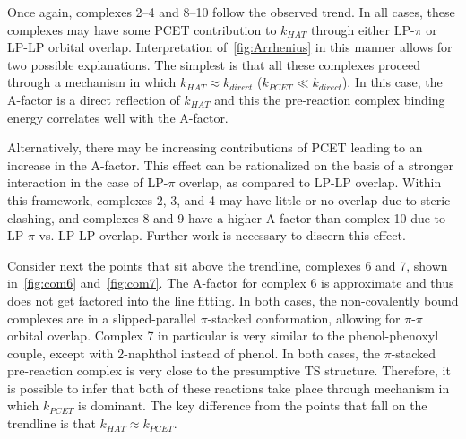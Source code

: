 Once again, complexes 2--4 and 8--10 follow the observed trend. In all cases,
these complexes may have some PCET contribution to $k_{HAT}$ through either
LP-$\pi$ or LP-LP orbital overlap. Interpretation of~\ref{fig:Arrhenius} in this
manner allows for two possible explanations. The simplest is that all these
complexes proceed through a mechanism in which $k_{HAT} \approx k_{direct}$
($k_{PCET} \ll k_{direct}$). In this case, the A-factor is a direct reflection
of $k_{HAT}$ and this the pre-reaction complex binding energy correlates well
with the A-factor.

Alternatively, there may be increasing contributions of PCET leading to an
increase in the A-factor. This effect can be rationalized on the basis of a
stronger interaction in the case of LP-$\pi$ overlap, as compared to LP-LP
overlap. Within this framework, complexes 2, 3, and 4 may have little or no
overlap due to steric clashing, and complexes 8 and 9 have a higher A-factor
than complex 10 due to LP-$\pi$ vs. LP-LP overlap. Further work is necessary to
discern this effect.

Consider next the points that sit above the trendline, complexes 6 and 7, shown
in~\ref{fig:com6} and~\ref{fig:com7}. The A-factor for complex 6 is approximate
and thus does not get factored into the line fitting. In both cases, the
non-covalently bound complexes are in a slipped-parallel $\pi$-stacked
conformation, allowing for $\pi$-$\pi$ orbital overlap.  Complex 7 in particular
is very similar to the phenol-phenoxyl couple, except with 2-naphthol instead of
phenol. In both cases, the $\pi$-stacked pre-reaction complex is very close to
the presumptive TS structure. Therefore, it is possible to infer that both of
these reactions take place through mechanism in which $k_{PCET}$ is dominant.
The key difference from the points that fall on the trendline is that $k_{HAT}
\approx k_{PCET}$.


